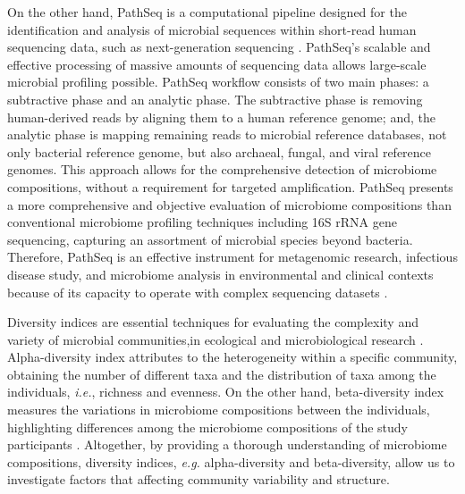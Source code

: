 \documentclass[11pt, a4paper, onecolumn, oneside]{report}
\begin{document}
        On the other hand, PathSeq is a computational pipeline designed for the identification and analysis of microbial sequences within short-read human sequencing data, such as next-generation sequencing \cite{PathSeq-1, PathSeq-2}. PathSeq's scalable and effective processing of massive amounts of sequencing data allows large-scale microbial profiling possible. PathSeq workflow consists of two main phases: a subtractive phase and an analytic phase. The subtractive phase is removing human-derived reads by aligning them to a human reference genome; and, the analytic phase is mapping remaining reads to microbial reference databases, not only bacterial reference genome, but also archaeal, fungal, and viral reference genomes. This approach allows for the comprehensive detection of microbiome compositions, without a requirement for targeted amplification. PathSeq presents a more comprehensive and objective evaluation of microbiome compositions than conventional microbiome profiling techniques including 16S rRNA gene sequencing, capturing an assortment of microbial species beyond bacteria. Therefore, PathSeq is an effective instrument for metagenomic research, infectious disease study, and microbiome analysis in environmental and clinical contexts because of its capacity to operate with complex sequencing datasets \cite{PathSeq-analysis-1, PathSeq-analysis-2, PathSeq-analysis-3}.

        Diversity indices are essential techniques for evaluating the complexity and variety of microbial communities,in ecological and microbiological research \cite{Diversity-1, Diversity-2}. Alpha-diversity index attributes to the heterogeneity within a specific community, obtaining the number of different taxa and the distribution of taxa among the individuals, \textit{i.e.}, richness and evenness. On the other hand, beta-diversity index measures the variations in microbiome compositions between the individuals, highlighting differences among the microbiome compositions of the study participants \cite{Diversity-3}. Altogether, by providing a thorough understanding of microbiome compositions, diversity indices, \textit{e.g.} alpha-diversity and beta-diversity, allow us to investigate factors that affecting community variability and structure.
\end{document}
